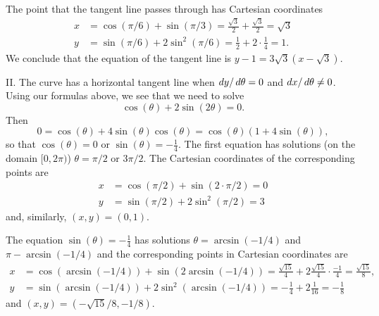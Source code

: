 \documentclass[noauthor]{ximera}
\begin{document}
\begin{problem}
\begin{freeResponse}
The point that the tangent line passes through has Cartesian coordinates
\begin{align*}
x &= \cos(\pi/6) + \sin (\pi/3) = \frac{\sqrt{3}}{2} + \frac{\sqrt{3}}{2} = \sqrt{3} \\
y &= \sin(\pi/6) + 2 \sin^2(\pi/6) = \frac{1}{2} + 2 \cdot \frac{1}{4} = 1.
\end{align*}
We conclude that the equation of the tangent line is $y-1 = 3 \sqrt{3}(x-\sqrt{3})$.

II. The curve has a horizontal tangent line when $\mathop{}\!d y/ \mathop{}\!d \theta = 0$ and $\mathop{}\!d x /\mathop{}\!d \theta \neq 0$. Using our formulas above, we see that we need to solve
$$
\cos(\theta) + 2 \sin(2 \theta) = 0.
$$
Then 
$$
0 = \cos(\theta) + 4 \sin(\theta) \cos(\theta) = \cos(\theta) ( 1+ 4 \sin(\theta)),
$$
so that $\cos(\theta) = 0$ or $\sin(\theta) = - \frac{1}{4}$. The first equation has solutions (on the domain $[0,2\pi)$) $\theta = \pi/2$ or $3\pi/2$. The Cartesian coordinates of the corresponding points are
\begin{align*}
x &= \cos (\pi/2) + \sin(2 \cdot \pi/2) = 0\\
y &= \sin(\pi/2) + 2 \sin^2(\pi/2) = 3
\end{align*}
and, similarly, $(x,y) = (0,1)$. 

The equation $\sin(\theta) = -\frac{1}{4}$ has solutions $\theta = \arcsin (-1/4)$ and $\pi - \arcsin(-1/4)$ and the corresponding points in Cartesian coordinates are
\begin{align*}
x &= \cos (\arcsin(-1/4)) + \sin (2 \arcsin(-1/4)) = \frac{\sqrt{15}}{4} + 2 \frac{\sqrt{15}}{4} \cdot \frac{-1}{4} = \frac{\sqrt{15}}{8}, \\
y &= \sin(\arcsin(-1/4)) + 2 \sin^2 (\arcsin(-1/4)) = -\frac{1}{4} + 2 \frac{1}{16} = -\frac{1}{8}
\end{align*}
and $(x,y) = (-\sqrt{15}/8,-1/8)$. 
\end{freeResponse}
\end{problem}
\end{document}
